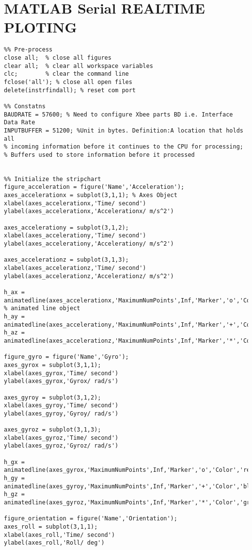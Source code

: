 \section{MATLAB Serial REALTIME PLOTING}\label{appendix-realtime} 
\begin{lstlisting} 
%% Pre-process
close all;  % close all figures
clear all;  % clear all workspace variables
clc;        % clear the command line
fclose('all'); % close all open files
delete(instrfindall); % reset com port 

%% Constatns
BAUDRATE = 57600; % Need to configure Xbee parts BD i.e. Interface Data Rate
INPUTBUFFER = 51200; %Unit in bytes. Definition:A location that holds all 
% incoming information before it continues to the CPU for processing; 
% Buffers used to store information before it processed


%% Initialize the stripchart
figure_acceleration = figure('Name','Acceleration');
axes_accelerationx = subplot(3,1,1); % Axes Object
xlabel(axes_accelerationx,'Time/ second')
ylabel(axes_accelerationx,'Accelerationx/ m/s^2')

axes_accelerationy = subplot(3,1,2);
xlabel(axes_accelerationy,'Time/ second')
ylabel(axes_accelerationy,'Accelerationy/ m/s^2')

axes_accelerationz = subplot(3,1,3);
xlabel(axes_accelerationz,'Time/ second')
ylabel(axes_accelerationz,'Accelerationz/ m/s^2')

h_ax = animatedline(axes_accelerationx,'MaximumNumPoints',Inf,'Marker','o','Color','red'); % animated line object
h_ay = animatedline(axes_accelerationy,'MaximumNumPoints',Inf,'Marker','+','Color','blue');
h_az = animatedline(axes_accelerationz,'MaximumNumPoints',Inf,'Marker','*','Color','green');

figure_gyro = figure('Name','Gyro');
axes_gyrox = subplot(3,1,1);
xlabel(axes_gyrox,'Time/ second')
ylabel(axes_gyrox,'Gyrox/ rad/s')

axes_gyroy = subplot(3,1,2);
xlabel(axes_gyroy,'Time/ second')
ylabel(axes_gyroy,'Gyroy/ rad/s')

axes_gyroz = subplot(3,1,3);
xlabel(axes_gyroz,'Time/ second')
ylabel(axes_gyroz,'Gyroz/ rad/s')

h_gx = animatedline(axes_gyrox,'MaximumNumPoints',Inf,'Marker','o','Color','red');
h_gy = animatedline(axes_gyroy,'MaximumNumPoints',Inf,'Marker','+','Color','blue');
h_gz = animatedline(axes_gyroz,'MaximumNumPoints',Inf,'Marker','*','Color','green');

figure_orientation = figure('Name','Orientation');
axes_roll = subplot(3,1,1);
xlabel(axes_roll,'Time/ second')
ylabel(axes_roll,'Roll/ deg')


\end{lstlisting}
